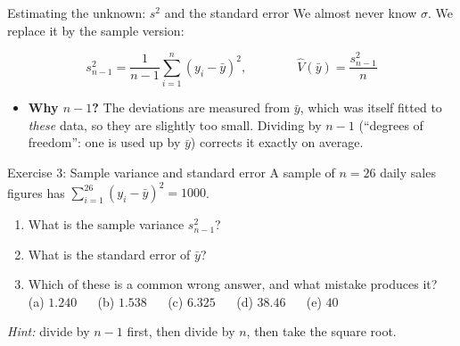 \documentclass[
  11pt,
  ignorenonframetext,
  aspectratio=169,
]{beamer}
\providecommand{\tightlist}{%
  \setlength{\itemsep}{0pt}\setlength{\parskip}{0pt}}
\begin{document}
\begin{frame}{Estimating the unknown: \(s^2\) and the standard error}
\protect{}\label{estimating-the-unknown-s2-and-the-standard-error}
We almost never know \(\sigma\). We replace it by the sample version:

\[s_{n-1}^2=\frac{1}{n-1}\sum_{i=1}^n (y_i-\bar y)^2 ,\qquad\qquad \hat{V}(\bar y)=\frac{s^2_{n-1}}{n}\]

\begin{itemize}
\item
  \textbf{Why \(n-1\)?} The deviations are measured from \(\bar y\),
  which was itself fitted to \emph{these} data, so they are slightly too
  small. Dividing by \(n-1\) (``degrees of freedom'': one is used up by
  \(\bar y\)) corrects it exactly on average.
\end{itemize}
\end{frame}


\begin{frame}{Exercise 3: Sample variance and standard error}
\protect{}\label{exercise-3-sample-variance-and-standard-error}
A sample of \(n=26\) daily sales figures has
\(\sum_{i=1}^{26}(y_i-\bar y)^2=1000\).

\begin{enumerate}
\tightlist
\item
  What is the sample variance \(s^2_{n-1}\)?
\item
  What is the standard error of \(\bar y\)?
\item
  Which of these is a common wrong answer, and what mistake produces it? \\
  (a) \(1.240\) \(\quad\) (b) \(1.538\) \(\quad\) (c)
  \(6.325\) \(\quad\) (d) \(38.46\) \(\quad\) (e) \(40\)
\end{enumerate}

\emph{Hint:} divide by \(n-1\) first, then divide by \(n\), then take
the square root.
\end{frame}
\end{document}
